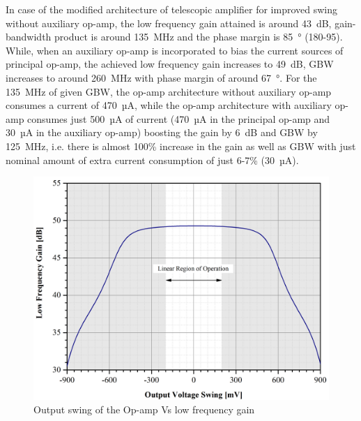 In case of the modified architecture of telescopic amplifier for improved swing without auxiliary op-amp, the low frequency gain attained is around 43~dB, gain-bandwidth product is around 135~MHz and the phase margin is 85~° (180-95). While, when an auxiliary op-amp is incorporated to bias the current sources of principal op-amp, the achieved low frequency gain increases to 49~dB, GBW increases to around 260~MHz with phase margin of around 67~°. For the 135~MHz of given GBW, the op-amp architecture without auxiliary op-amp consumes a current of 470~µA, while the op-amp architecture with auxiliary op-amp consumes just 500~µA of current (470~µA in the principal op-amp and 30~µA in the auxiliary op-amp) boosting the gain by 6~dB and GBW by 125~MHz, i.e. there is almost 100\% increase in the gain as well as GBW with just nominal amount of extra current consumption of just 6-7\% (30~µA).
%
\begin{figure}[h!]
\centering
\includegraphics[width=0.9\columnwidth]{Chap05/Figures/gain_vs_swing.png}
\caption{Output swing of the Op-amp Vs low frequency gain}
\label{fig:gain_vs_swing}
\end{figure}
%

